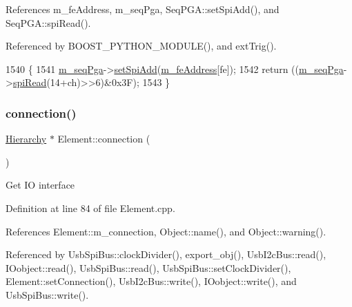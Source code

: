 References m\+\_\+fe\+Address, m\+\_\+seq\+Pga, Seq\+P\+G\+A\+::set\+Spi\+Add(), and Seq\+P\+G\+A\+::spi\+Read().



Referenced by B\+O\+O\+S\+T\+\_\+\+P\+Y\+T\+H\+O\+N\+\_\+\+M\+O\+D\+U\+L\+E(), and ext\+Trig().


\begin{DoxyCode}
1540                                           \{
1541   \hyperlink{classFEB__v1_a6c7804ac86796f233a8393043adf2e77}{m\_seqPga}->\hyperlink{classSeqPGA_ac998ce3a6d9b5f2e88cc8393f8c1df53}{setSpiAdd}(\hyperlink{classFEB__v1_a4e1945c2d5b434125f375e9d0fc6d99f}{m\_feAddress}[fe]);
1542   \textcolor{keywordflow}{return} ((\hyperlink{classFEB__v1_a6c7804ac86796f233a8393043adf2e77}{m\_seqPga}->\hyperlink{classSeqPGA_ab3d0e5e5d4014bc7a92588a76b8713d4}{spiRead}(14+ch)>>6)&0x3F);
1543 \}
\end{DoxyCode}
\mbox{\label{classElement_af57444353c1ddf9fa0109801e97debf7}} 
\subsubsection{\texorpdfstring{connection()}{connection()}}
{\footnotesize\ttfamily \hyperlink{classHierarchy}{Hierarchy} $\ast$ Element\+::connection (\begin{DoxyParamCaption}{ }\end{DoxyParamCaption})\hspace{0.3cm}{\ttfamily [inherited]}}

Get IO interface 

Definition at line 84 of file Element.\+cpp.



References Element\+::m\+\_\+connection, Object\+::name(), and Object\+::warning().



Referenced by Usb\+Spi\+Bus\+::clock\+Divider(), export\+\_\+obj(), Usb\+I2c\+Bus\+::read(), I\+Oobject\+::read(), Usb\+Spi\+Bus\+::read(), Usb\+Spi\+Bus\+::set\+Clock\+Divider(), Element\+::set\+Connection(), Usb\+I2c\+Bus\+::write(), I\+Oobject\+::write(), and Usb\+Spi\+Bus\+::write().


